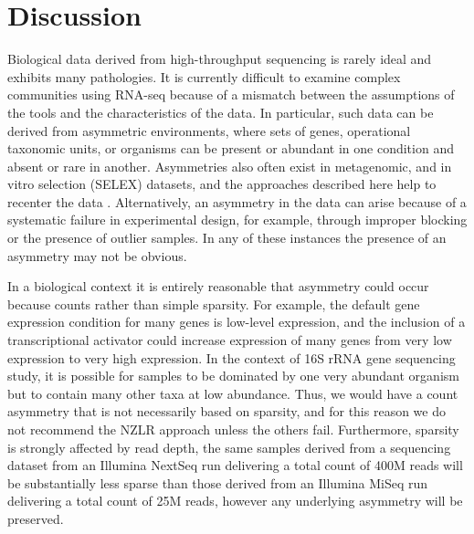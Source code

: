 \documentclass[graybox]{svmult}
\begin{document}
\section*{Discussion}

Biological data derived from high-throughput sequencing is rarely ideal and exhibits many pathologies. It is currently difficult to examine complex communities using RNA-seq because of a mismatch between the assumptions of the tools and the characteristics of the data. In particular, such data can be derived from asymmetric environments, where sets of genes, operational taxonomic units, or organisms can be present or abundant in one condition and absent or rare in another. Asymmetries also often exist in metagenomic, and in vitro selection (SELEX) datasets, and the approaches described here help to recenter the data  \cite{Almeida:2019aa,McMurrough:2018aa,Wolfs:2016aa}.  Alternatively, an asymmetry in the data can arise because of a systematic failure in experimental design, for example, through improper blocking or the presence of outlier samples. In any of these instances the presence of an asymmetry may not be obvious. 

In a biological context it is entirely reasonable that asymmetry could occur because counts  rather than simple sparsity. For example, the default gene expression condition for many genes is low-level expression, and the inclusion of a transcriptional activator could increase expression of many genes from very low expression to very high expression. In the context of 16S rRNA gene sequencing study, it is possible for samples to be dominated by one very abundant organism but to contain many other taxa at low abundance. Thus, we would have a count asymmetry that is not necessarily based on sparsity, and for this reason we do not recommend the NZLR approach unless the others fail. Furthermore, sparsity is strongly affected by read depth, the same samples derived from a sequencing dataset from an Illumina NextSeq run delivering a total count of 400M reads will be substantially less sparse than those derived from an Illumina MiSeq run delivering a total count of 25M reads, however any underlying asymmetry will be preserved.
\end{document}
